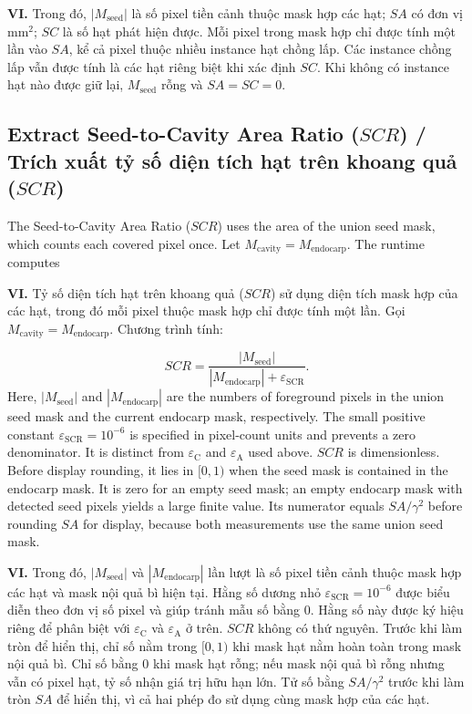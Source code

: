 \documentclass[final,1p,11pt,longtitle]{elsarticle}
\newenvironment{viet}{\par\smallskip\begingroup\color{viColor}\noindent\textbf{VI. }\ignorespaces}{\par\endgroup\smallskip}
\begin{document}
\begin{viet}
Trong đó, $|M_{\mathrm{seed}}|$ là số pixel tiền cảnh thuộc mask hợp các hạt; $SA$ có đơn vị mm$^2$; $SC$ là số hạt phát hiện được. Mỗi pixel trong mask hợp chỉ được tính một lần vào $SA$, kể cả pixel thuộc nhiều instance hạt chồng lấp. Các instance chồng lấp vẫn được tính là các hạt riêng biệt khi xác định $SC$. Khi không có instance hạt nào được giữ lại, $M_{\mathrm{seed}}$ rỗng và $SA=SC=0$.
\end{viet}


\subsection*{Extract Seed-to-Cavity Area Ratio ($SCR$) / {\color{viColor} Trích xuất tỷ số diện tích hạt trên khoang quả ($SCR$)}}
The Seed-to-Cavity Area Ratio ($SCR$) uses the area of the union seed mask, which counts each covered pixel once. Let $M_{\mathrm{cavity}}=M_{\mathrm{endocarp}}$. The runtime computes

\begin{viet}
Tỷ số diện tích hạt trên khoang quả ($SCR$) sử dụng diện tích mask hợp của các hạt, trong đó mỗi pixel thuộc mask hợp chỉ được tính một lần. Gọi $M_{\mathrm{cavity}}=M_{\mathrm{endocarp}}$. Chương trình tính:
\end{viet}

\begin{equation}
 SCR=\frac{|M_{\mathrm{seed}}|}{|M_{\mathrm{endocarp}}|+\varepsilon_{\mathrm{SCR}}}.
\end{equation}
Here, $|M_{\mathrm{seed}}|$ and $|M_{\mathrm{endocarp}}|$ are the numbers of foreground pixels in the union seed mask and the current endocarp mask, respectively. The small positive constant $\varepsilon_{\mathrm{SCR}}=10^{-6}$ is specified in pixel-count units and prevents a zero denominator. It is distinct from $\varepsilon_{\mathrm{C}}$ and $\varepsilon_{\mathrm{A}}$ used above. $SCR$ is dimensionless. Before display rounding, it lies in $[0,1)$ when the seed mask is contained in the endocarp mask. It is zero for an empty seed mask; an empty endocarp mask with detected seed pixels yields a large finite value. Its numerator equals $SA/\gamma^2$ before rounding $SA$ for display, because both measurements use the same union seed mask.

\begin{viet}
Trong đó, $|M_{\mathrm{seed}}|$ và $|M_{\mathrm{endocarp}}|$ lần lượt là số pixel tiền cảnh thuộc mask hợp các hạt và mask nội quả bì hiện tại. Hằng số dương nhỏ $\varepsilon_{\mathrm{SCR}}=10^{-6}$ được biểu diễn theo đơn vị số pixel và giúp tránh mẫu số bằng 0. Hằng số này được ký hiệu riêng để phân biệt với $\varepsilon_{\mathrm{C}}$ và $\varepsilon_{\mathrm{A}}$ ở trên. $SCR$ không có thứ nguyên. Trước khi làm tròn để hiển thị, chỉ số nằm trong $[0,1)$ khi mask hạt nằm hoàn toàn trong mask nội quả bì. Chỉ số bằng 0 khi mask hạt rỗng; nếu mask nội quả bì rỗng nhưng vẫn có pixel hạt, tỷ số nhận giá trị hữu hạn lớn. Tử số bằng $SA/\gamma^2$ trước khi làm tròn $SA$ để hiển thị, vì cả hai phép đo sử dụng cùng mask hợp của các hạt.
\end{viet}
\end{document}
